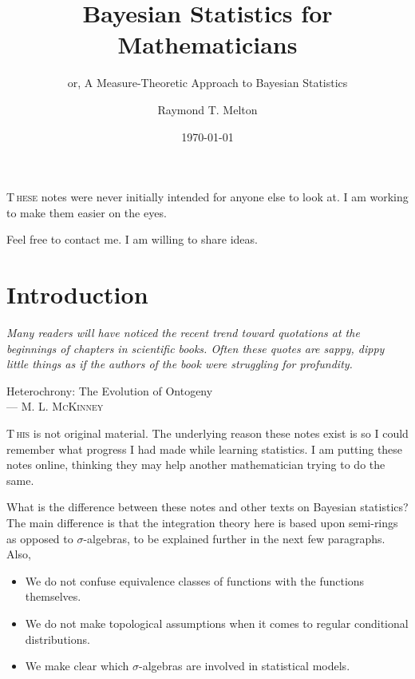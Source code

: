 \documentclass[
twoside=true,
paper=letter,
fontsize=9pt,
pagesize=auto,
leqno,
openany,
headsepline,
overfullrule,
]{scrbook}
\title{Bayesian Statistics for Mathematicians}
\subtitle{or, A Measure-Theoretic Approach to Bayesian Statistics}
\author{\textsf{Raymond T. Melton}}
\date{\textsf{\today}}
\theoremstyle{plain}
\theoremstyle{plain}
\theoremstyle{definition}
\theoremstyle{bfnoteitalic}
\theoremstyle{bfnoteroman}
\newcommand{\textsigma}{\hbox{\large{$\sigma$}}\kern-1pt}
\begin{document}
\frontmatter



\maketitle
{\renewcommand*\normalfont{}%
\normalfont%
\tableofcontents
}


\lettrine{T}{\,hese} notes were never initially intended for anyone else to look at.
I am working to make them easier on the eyes.

Feel free to contact me. I am willing to share ideas.



\mainmatter
\chapter{Introduction}
\epigraph{\textit{Many readers will have noticed the recent trend toward quotations at the beginnings of chapters in scientific books.  Often these quotes are sappy, dippy little things as if the authors of the book were struggling for profundity.}}
{{Heterochrony: The Evolution of Ontogeny}\\ \textsc{--- M. L. McKinney}}

\lettrine{T}{\,his} is not original material. The underlying reason these notes exist is so I could remember what progress I had made while learning statistics.
I am putting these notes online, thinking  they may help another mathematician trying to do the same.


What is the difference between these notes and other texts on Bayesian statistics?
The main difference is that the integration theory here is based upon semi-rings as opposed to \textsigma\hyp{}algebras, to be explained further in the next few paragraphs.
Also,
\begin{itemize}
\item
We do not confuse equivalence classes of functions with the functions themselves.
\item
We do not make topological assumptions when it comes to regular conditional distributions.
\item
We make clear which \textsigma\hyp{}algebras are involved in statistical models.
\end{itemize}
\end{document}

